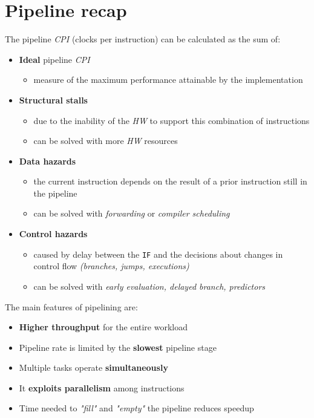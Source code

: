 \documentclass[english]{article}
\begin{document}
\newpage

\section{Pipeline recap}

The pipeline \textit{CPI} (clocks per instruction) can be calculated as the sum of:

\begin{itemize}
  \item \textbf{Ideal} pipeline \textit{CPI}
        \begin{itemize}
          \item measure of the maximum performance attainable by the implementation
        \end{itemize}
  \item \textbf{Structural stalls}
        \begin{itemize}
          \item due to the inability of the \textit{HW} to support this combination of instructions
          \item can be solved with more \textit{HW} resources
        \end{itemize}
  \item \textbf{Data hazards}
        \begin{itemize}
          \item the current instruction depends on the result of a prior instruction still in the pipeline
          \item can be solved with \textit{forwarding} or \textit{compiler scheduling}
        \end{itemize}
  \item \textbf{Control hazards}
        \begin{itemize}
          \item caused by delay between the \texttt{IF} and the decisions about changes in control flow \textit{(branches, jumps, executions)}
          \item can be solved with \textit{early evaluation, delayed branch, predictors}
        \end{itemize}
\end{itemize}

\bigskip
The main features of pipelining are:
\begin{itemize}
  \item \textbf{Higher throughput} for the entire workload
  \item Pipeline rate is limited by the \textbf{slowest} pipeline stage
  \item Multiple tasks operate \textbf{simultaneously}
  \item It \textbf{exploits parallelism} among instructions
  \item Time needed to \textit{"fill"} and \textit{"empty"} the pipeline reduces speedup
\end{itemize}
\end{document}
